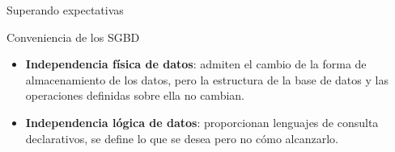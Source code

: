 \begin{frame}{Superando expectativas}
    \begin{block}{Conveniencia de los SGBD}
        \begin{itemize}
            \item<2-> \textbf{Independencia f\'isica de datos}: admiten el cambio de la forma de
            almacenamiento de los datos, pero la estructura de la base de datos y las operaciones
            definidas sobre ella no cambian.
            \item<3-> \textbf{Independencia l\'ogica de datos}: proporcionan lenguajes de consulta declarativos, se define
            lo que se desea pero no c\'omo alcanzarlo.
        \end{itemize}
        
    \end{block}

\end{frame}



